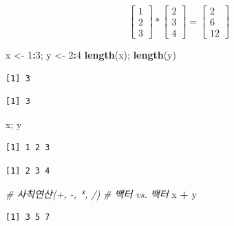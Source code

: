 \documentclass[
  11pt,
]{krantz}
\newenvironment{Shaded}{\begin{snugshade}}{\end{snugshade}}
\newcommand{\CommentTok}[1]{\textcolor[rgb]{0.37,0.37,0.37}{\textit{#1}}}
\newcommand{\DecValTok}[1]{\textcolor[rgb]{0.06,0.06,0.06}{#1}}
\newcommand{\KeywordTok}[1]{\textcolor[rgb]{0.27,0.27,0.27}{\textbf{#1}}}
\newcommand{\NormalTok}[1]{#1}
\newcommand{\OperatorTok}[1]{\textcolor[rgb]{0.43,0.43,0.43}{\textbf{#1}}}
\newcommand{\StringTok}[1]{\textcolor[rgb]{0.5,0.5,0.5}{#1}}
\begin{document}
\[\begin{bmatrix}
1 \\ 2\\ 3
\end{bmatrix} * 
\begin{bmatrix}
2 \\ 3\\ 4
\end{bmatrix} = 
\begin{bmatrix}
2 \\ 6 \\ 12
\end{bmatrix}
\]

\footnotesize

\begin{Shaded}
\begin{Highlighting}[]
\NormalTok{x <-}\StringTok{ }\DecValTok{1}\OperatorTok{:}\DecValTok{3}\NormalTok{; y <-}\StringTok{ }\DecValTok{2}\OperatorTok{:}\DecValTok{4}
\KeywordTok{length}\NormalTok{(x); }\KeywordTok{length}\NormalTok{(y)}
\end{Highlighting}
\end{Shaded}

\begin{verbatim}
[1] 3
\end{verbatim}

\begin{verbatim}
[1] 3
\end{verbatim}

\begin{Shaded}
\begin{Highlighting}[]
\NormalTok{x; y}
\end{Highlighting}
\end{Shaded}

\begin{verbatim}
[1] 1 2 3
\end{verbatim}

\begin{verbatim}
[1] 2 3 4
\end{verbatim}

\begin{Shaded}
\begin{Highlighting}[]
\CommentTok{# 사칙연산(+, -, *, /)}
\CommentTok{# 백터 vs. 백터}
\NormalTok{x }\OperatorTok{+}\StringTok{ }\NormalTok{y}
\end{Highlighting}
\end{Shaded}

\begin{verbatim}
[1] 3 5 7
\end{verbatim}
\end{document}
